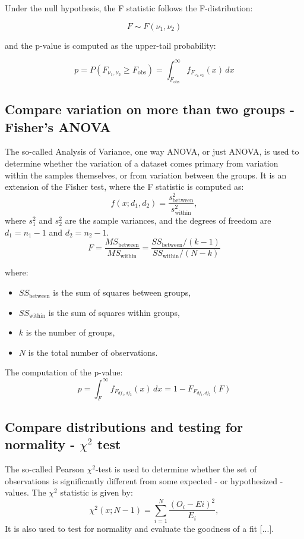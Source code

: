 \documentclass{book}
\begin{document}
Under the null hypothesis, the F statistic follows the F-distribution:

\[
F \sim F(\nu_1, \nu_2)
\]

and the p-value is computed as the upper-tail probability:

\[
p = P(F_{\nu_1, \nu_2} \geq F_{\text{obs}}) = \int_{F_{\text{obs}}}^{\infty} f_{F_{\nu_1, \nu_2}}(x)\,dx
\]

\newpage

\subsection{Compare variation on more than two groups - Fisher's ANOVA}

The so-called Analysis of Variance, one way ANOVA, or just ANOVA, is used to determine whether the variation of a dataset comes primary from variation within the samples themselves, or from variation between the groups. It is an extension of the Fisher test, where the F statistic is computed as:
\[
    f(x; d_{1}, d_{2}) = \frac{s_\text{between}^{2}}{s_\text{within}^{2}},
\]
where $s_1^{2}$ and $s_2^{2}$ are the sample variances, and the degrees of freedom are $d_1 = n_1 - 1$ and $d_2 = n_2 - 1$.\\


\[
F = \frac{MS_{\text{between}}}{MS_{\text{within}}} = \frac{SS_{\text{between}} / (k - 1)}{SS_{\text{within}} / (N - k)}
\]

where:
\begin{itemize}
  \item $SS_{\text{between}}$ is the sum of squares between groups,
  \item $SS_{\text{within}}$ is the sum of squares within groups,
  \item $k$ is the number of groups,
  \item $N$ is the total number of observations.
\end{itemize}

The computation of the p-value:
\[
p = \int_{F}^{\infty} f_{F_{df_1, df_2}}(x)\,dx = 1 - F_{F_{df_1, df_2}}(F)
\]


\newpage

\subsection{Compare distributions and testing for normality - $\chi^{2}$ test}

The so-called Pearson $\chi^{2}$-test is used to determine whether the set of observations is significantly different from some expected - or hypothesized - values. The $\chi^{2}$ statistic is given by:
\[
    \chi^{2}(x; N - 1) = \sum_{i = 1}^{N}\frac{(O_{i} - E{i})^{2}}{E_i},
\]
It is also used to test for normality and evaluate the goodness of a fit [...].\\\
\end{document}
